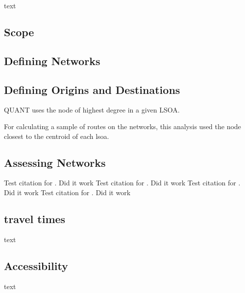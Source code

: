 text

\subsection{Scope}

\subsection{Defining Networks}

\subsection{Defining Origins and Destinations}

QUANT uses the node of highest degree in a given LSOA. 

For calculating a sample of routes on the networks, this analysis used the node closest to the centroid of each lsoa. 



\subsection{Assessing Networks}

Test citation for \cite{osmnx}. Did it work
Test citation for \cite{networkx}. Did it work
Test citation for \cite{qgis}. Did it work
Test citation for \cite{python}. Did it work
\subsection{travel times}

text

\subsection{Accessibility}

text
